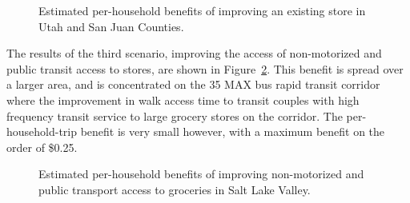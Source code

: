 \documentclass[
  letterpaper,
  number,
  review,
  3p]{elsarticle}
\begin{document}
\begin{figure}

\begin{minipage}{0.50\linewidth}



\end{minipage}%
%
\begin{minipage}{0.50\linewidth}



\end{minipage}%

\caption{\label{fig-s2sjut}Estimated per-household benefits of improving
an existing store in Utah and San Juan Counties.}

\end{figure}%

The results of the third scenario, improving the access of non-motorized
and public transit access to stores, are shown in
Figure~\ref{fig-s3results}. This benefit is spread over a larger area,
and is concentrated on the 35 MAX bus rapid transit corridor where the
improvement in walk access time to transit couples with high frequency
transit service to large grocery stores on the corridor. The
per-household-trip benefit is very small however, with a maximum benefit
on the order of \$0.25.

\begin{figure}


\caption{\label{fig-s3results}Estimated per-household benefits of
improving non-motorized and public transport access to groceries in Salt
Lake Valley.}

\end{figure}%
\end{document}
